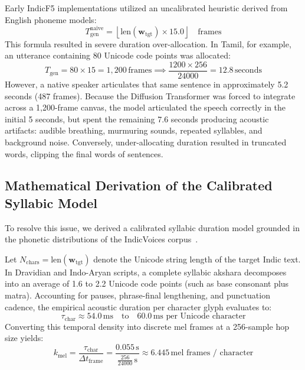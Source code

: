 Early IndicF5 implementations utilized an uncalibrated heuristic derived from English phoneme models:
\begin{equation}
    T_{\text{gen}}^{\text{naive}} = \left\lfloor \text{len}(\mathbf{w}_{\text{tgt}}) \times 15.0 \right\rfloor \quad \text{frames}
    \label{eq:naive_duration}
\end{equation}
This formula resulted in severe duration over-allocation. In Tamil, for example, an utterance containing 80 Unicode code points was allocated:
\begin{equation}
    T_{\text{gen}} = 80 \times 15 = 1,200\,\text{frames} \implies \frac{1200 \times 256}{24000} = 12.8\,\text{seconds}
\end{equation}
However, a native speaker articulates that same sentence in approximately 5.2 seconds (487 frames). Because the Diffusion Transformer was forced to integrate across a 1,200-frame canvas, the model articulated the speech correctly in the initial 5 seconds, but spent the remaining 7.6 seconds producing acoustic artifacts: audible breathing, murmuring sounds, repeated syllables, and background noise. Conversely, under-allocating duration resulted in truncated words, clipping the final words of sentences.

\subsection{Mathematical Derivation of the Calibrated Syllabic Model}
To resolve this issue, we derived a calibrated syllabic duration model grounded in the phonetic distributions of the IndicVoices corpus~\cite{indicvoices2024}. 

Let $N_{\text{chars}} = \text{len}(\mathbf{w}_{\text{tgt}})$ denote the Unicode string length of the target Indic text. In Dravidian and Indo-Aryan scripts, a complete syllabic akshara decomposes into an average of 1.6 to 2.2 Unicode code points (such as base consonant plus matra). Accounting for pauses, phrase-final lengthening, and punctuation cadence, the empirical acoustic duration per character glyph evaluates to:
\begin{equation}
    \tau_{\text{char}} \approx 54.0\,\text{ms} \quad \text{to} \quad 60.0\,\text{ms per Unicode character}
    \label{eq:char_temporal_density}
\end{equation}
Converting this temporal density into discrete mel frames at a 256-sample hop size yields:
\begin{equation}
    k_{\text{mel}} = \frac{\tau_{\text{char}}}{\Delta t_{\text{frame}}} = \frac{0.055\,\text{s}}{\frac{256}{24000}\,\text{s}} \approx 6.445\,\text{mel frames / character}
    \label{eq:mel_density_derivation}
\end{equation}

